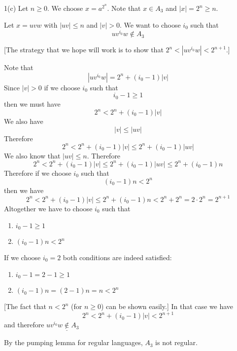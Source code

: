 
1(c)
Let $n \geq 0$.
We choose $x = a^{2^n}$.
Note that $x \in A_3$ and $|x| = 2^n \geq n$.

Let $x = uvw$ with $|uv| \leq n$ and $|v| > 0$.
We want to choose $i_0$ such that
\[
u v^{i_0} w \not\in A_3
\]

[The strategy that we hope will work is to
show that $2^n < |uv^{i_0}w| < 2^{n+1}$.]

Note that 
\[
|u v^{i_0} w| = 2^n + (i_0 - 1)|v|
\]
Since $|v| > 0$ if we choose $i_0$ such that
\[
i_0 - 1 \geq 1
\]
then we must have
\[
2^n < 2^n + (i_0 - 1) |v|
\]
We also have
\[
|v| \leq |uv| 
\]
Therefore
\[
2^n < 2^n + (i_0 - 1) |v| \leq 2^n + (i_0 - 1) |uv| 
\]
We also know that $|uv| \leq n$.
Therefore
\[
2^n < 2^n + (i_0 - 1) |v| \leq 2^n + (i_0 - 1) |uv| \leq 2^n + (i_0 - 1) n
\]
Therefore if we choose $i_0$ such that
\[
(i_0 - 1) n < 2^n
\]
then we have
\[
2^n < 2^n + (i_0 - 1) |v| \leq 2^n + (i_0 - 1) n < 2^n + 2^n = 2\cdot 2^n 
= 2^{n+1}
\]
Altogether we have to choose $i_0$ such that 
\begin{enumerate}
\item $i_0 - 1 \geq 1$
\item $(i_0 - 1) n < 2^n$
\end{enumerate}
If we choose $i_0 = 2$
both conditions are indeed
satisfied:
\begin{enumerate}
\item $i_0 - 1 = 2 - 1 \geq 1$
\item $(i_0 - 1) n = (2 - 1) n = n < 2^n$
\end{enumerate}
[The fact that $n < 2^n$ (for $n \geq 0$) can be shown easily.]
In that case we have
\[
2^n < 2^n + (i_0 - 1) |v| < 2^{n+1}
\]
and therefore $uv^{i_0}w \underline{\not \in} A_3$ 

By the pumping lemma for regular languages,
$A_3$ is not regular.
